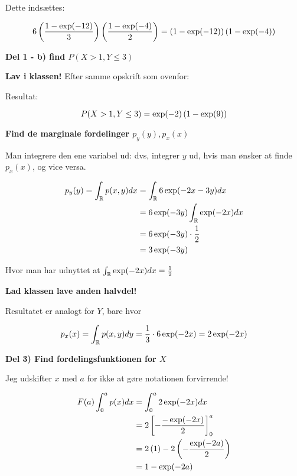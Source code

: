Dette indsættes:

\begin{align}
    6 \left( \frac{1 - \exp(-12)}{3} \right) \left( \frac{1 - \exp(-4)}{2} \right) = \left( 1 - \exp(-12) \right) \left( 1 - \exp(-4) \right)
\end{align}

\textbf{Del 1 - b) find $P(X > 1, Y \leq 3)$}

\textbf{Lav i klassen!} Efter samme opskrift som ovenfor:

Resultat:

\begin{equation}
    P(X>1, Y\leq 3) = \exp(-2) \left( 1 - \exp(9) \right)
\end{equation}

\textbf{Find de marginale fordelinger $p_y(y), p_x(x)$}

Man integrere den ene variabel ud: dvs, integrer $y$ ud, hvis man ønsker at finde $p_x (x)$, og vice versa.

\begin{align}
    p_y(y) = \int_{\mathbb{R}} p(x,y) dx &=  \int_{\mathbb{R}} 6 \exp(-2x -3y) dx \\
    &= 6 \exp(-3y) \int_{\mathbb{R}} \exp(-2x) dx \\ &= 6 \exp(-3y) \cdot \frac{1}{2} \\
    &= 3 \exp(-3y)
\end{align}

Hvor man har udnyttet at $\int_{\mathbb{R}} \exp(-2x) dx = \frac{1}{2}$

\textbf{Lad klassen lave anden halvdel!}

Resultatet er analogt for $Y$, bare hvor

\begin{equation}
    p_x (x) = \int_{\mathbb{R}} p(x,y) dy = \frac{1}{3} \cdot 6 \exp(-2x) = 2 \exp(-2x)
\end{equation}

\textbf{Del 3) Find fordelingsfunktionen for $X$}

Jeg udskifter $x$ med $a$ for ikke at gøre notationen forvirrende!

\begin{align}
    F(a) \int_{0}^{a} p(x) dx &= \int_{0}^{a} 2 \exp(-2x) dx \\
    &= 2 \left[ -\frac{-\exp(-2x)}{2}\right]_{0}^{a} \\
    &= 2 \left( 1 \right) - 2\left(- \frac{\exp(-2a)}{2} \right) \\
    &= 1 - \exp(-2a)
\end{align}

